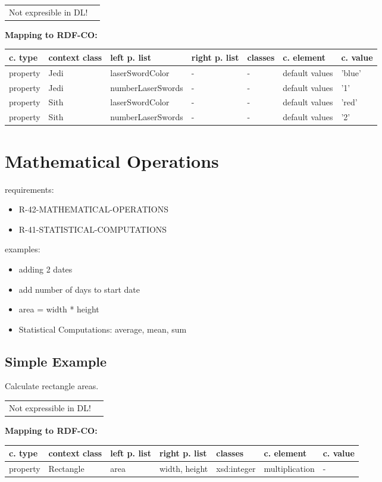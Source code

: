 \documentclass{llncs}
\newenvironment{gcotable}{
  \scriptsize
  \sffamily
  \vspace{0cm}
	\begin{center}
	\textbf{\vspace{0.4cm}Mapping to RDF-CO:} \\
  \begin{tabular}{l|l|l|l|l|l|l}
	\hline
  \textbf{c. type} & \textbf{context class} & \textbf{left p. list} & \textbf{right p. list} & \textbf{classes} & \textbf{c. element} & \textbf{c. value} \\
  \hline

}{
  \hline
  \end{tabular}
	\end{center}
}
\newenvironment{DL}{
  \vspace{0cm}
	\begin{center}
  \begin{tabular}{r l}

}{
  \end{tabular}
	\end{center}
}
\begin{document}
\begin{DL}
Not expresible in DL!
\end{DL}

\begin{gcotable}
property & Jedi & laserSwordColor & - & - & default values & 'blue' \\
property & Jedi & numberLaserSwords & - & - & default values & '1' \\
property & Sith & laserSwordColor & - & - & default values & 'red' \\
property & Sith & numberLaserSwords & - & - & default values & '2' \\
\end{gcotable}

\section{Mathematical Operations}

requirements:

\begin{itemize}
	\item R-42-MATHEMATICAL-OPERATIONS
	\item R-41-STATISTICAL-COMPUTATIONS
\end{itemize}



examples:

\begin{itemize}
	\item adding 2 dates
	\item add number of days to start date
	\item area = width * height
	\item Statistical Computations: average, mean, sum
\end{itemize}

\subsection{Simple Example}

Calculate rectangle areas.

\begin{DL}
Not expressible in DL!
\end{DL}

\begin{gcotable}
property & Rectangle & area & width, height & xsd:integer & multiplication & - \\
\end{gcotable}
\end{document}
